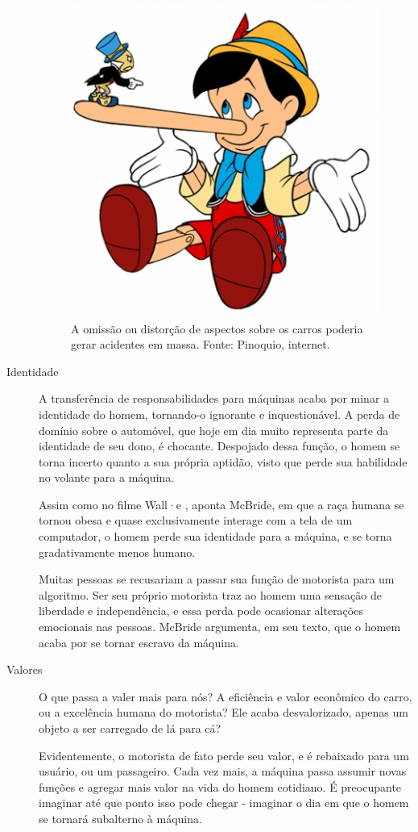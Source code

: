 \documentclass[12pt]{article}
\begin{document}
\begin{description}
			\begin{figure}[ht]
				\centering
				\includegraphics[width=.4\textwidth]{pinocchio.png}
				\caption{A omissão ou distorção de aspectos sobre os carros poderia gerar acidentes em massa. Fonte: Pinoquio, internet. }\label{fig:3}
			\end{figure}
			 
			\item [Identidade] A transferência de responsabilidades para máquinas acaba por minar a identidade do homem, tornando-o ignorante e inquestionável. A perda de domínio sobre o automóvel, que hoje em dia muito representa parte da identidade de seu dono, é chocante. Despojado dessa função, o homem se torna incerto quanto a sua própria aptidão, visto que perde sua habilidade no volante para a máquina.
			
			Assim como no filme Wall·e \citep{stanton_walle_2008}, aponta McBride, em que a raça humana se tornou obesa e quase exclusivamente interage com a tela de um computador, o homem perde sua identidade para a máquina, e se torna gradativamente menos humano.
			
			Muitas pessoas se recusariam a passar sua função de motorista para um algoritmo. Ser seu próprio motorista traz ao homem uma sensação de liberdade e independência, e essa perda pode ocasionar alterações emocionais nas pessoas. McBride argumenta, em seu texto, que o homem acaba por se tornar escravo da máquina.
			
			\item [Valores] O que passa a valer mais para nós? A eficiência e valor econômico do carro, ou a excelência humana do motorista? Ele acaba desvalorizado, apenas um objeto a ser carregado de lá para cá?
			
			Evidentemente, o motorista de fato perde seu valor, e é rebaixado para um usuário, ou um passageiro. Cada vez mais, a máquina passa assumir novas funções e agregar mais valor na vida do homem cotidiano. É preocupante imaginar até que ponto isso pode chegar - imaginar o dia em que o homem se tornará subalterno à máquina.
			

\end{description}
\end{document}
